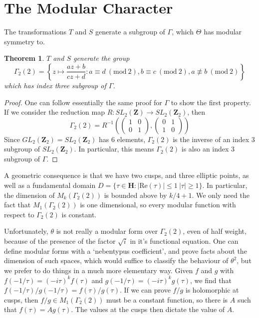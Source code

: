 \documentclass{article}
\theoremstyle{plain}
\newtheorem{theorem}{Theorem}
\theoremstyle{remark}
\theoremstyle{definition}
\begin{document}
\section{The Modular Character}

The transformations $T$ and $S$ generate a subgroup of $\Gamma$, which $\Theta$ has modular symmetry to.

\begin{theorem}
    $T$ and $S$ generate the group
%
\[ \Gamma_2(2) = \left\{ z \mapsto \frac{az + b}{cz + d}: a \equiv d\ (\text{mod}\ 2), b \equiv c\ (\text{mod}\ 2), a \not \equiv b\ (\text{mod}\ 2) \right\} \]
%
which has index three subgroup of $\Gamma$.
\end{theorem}
\begin{proof}
One can follow essentially the same proof for $\Gamma$ to show the first property. If we consider the reduction map $R: SL_2(\mathbf{Z}) \to SL_2(\mathbf{Z}_2)$, then
%
\[ \Gamma_2(2) = R^{-1} \left( \begin{pmatrix} 1 & 0 \\ 0 & 1 \end{pmatrix}, \begin{pmatrix} 0 & 1 \\ 1 & 0 \end{pmatrix} \right) \]
%
Since $GL_2(\mathbf{Z}_2) = SL_2(\mathbf{Z}_2)$ has $6$ elements, $\Gamma_2(2)$ is the inverse of an index 3 subgroup of $SL_2(\mathbf{Z}_2)$. In particular, this means $\Gamma_2(2)$ is also an index 3 subgroup of $\Gamma$.
\end{proof}

A geometric consequence is that we have two cusps, and three elliptic points, as well as a fundamental domain $D = \{ \tau \in \mathbf{H}: |\text{Re}(\tau)| \leq 1\ |\tau| \geq 1 \}$. In particular, the dimension of $M_k(\Gamma_2(2))$ is bounded above by $k/4 + 1$. We only need the fact that $M_1(\Gamma_2(2))$ is one dimensional, so every modular function with respect to $\Gamma_2(2)$ is constant.

Unfortunately, $\theta$ is not really a modular form over $\Gamma_2(2)$, even of half weight, because of the presence of the factor $\sqrt{i}$ in it's functional equation. One can define modular forms with a `nebentypus coefficient', and prove facts about the dimension of such spaces, which would suffice to classify the behaviour of $\theta^2$, but we prefer to do things in a much more elementary way. Given $f$ and $g$ with $f(-1/\tau) = (-i \tau)^k f(\tau)$ and $g(-1/\tau) = (-i \tau)^k g(\tau)$, we find that $f(-1/\tau)/g(-1/\tau) = f(\tau)/g(\tau)$. If we can prove $f/g$ is holomorphic at cusps, then $f/g \in M_1(\Gamma_2(2))$ must be a constant function, so there is $A$ such that $f(\tau) = Ag(\tau)$. The values at the cusps then dictate the value of $A$.
\end{document}

